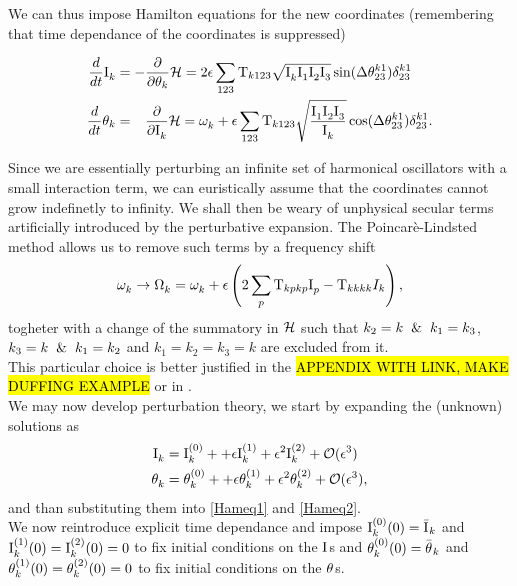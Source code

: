 We can thus impose Hamilton equations for the new coordinates (remembering that time dependance of the coordinates is suppressed)

\begin{align}
    \frac{d}{dt}\mathrm{I}^{}_k &= - \frac{\partial }{\partial \theta_k}\mathcal{H} = 2 \epsilon \sum_{123} \mathrm{T}_{k123} \sqrt{\mathrm{I}^{}_k\mathrm{I}^{}_1\mathrm{I}^{}_2\mathrm{I}^{}_3} \sin(\Delta\theta^{k1}_{23})\delta^{k1}_{23}
    \label{Hameq1}\\
    \frac{d}{dt}\theta_k &= \phantom{-} \frac{\partial }{\partial \mathrm{I}^{}_k}\mathcal{H} = \omega^{}_k + 
    \epsilon \sum_{123} \mathrm{T}_{k123} \sqrt{\frac{\mathrm{I}^{}_1\mathrm{I}^{}_2\mathrm{I}^{}_3}{\mathrm{I}^{}_k}}\cos(\Delta\theta^{k1}_{23})\delta^{k1}_{23}.
    \label{Hameq2}
\end{align}


Since we are essentially perturbing an infinite set of harmonical oscillators with a small interaction term, we can euristically assume that
the coordinates cannot grow indefinetly to infinity. We shall then be weary of unphysical secular terms artificially introduced by the perturbative
expansion. The Poincarè-Lindsted method allows us to remove such terms by a frequency shift
\begin{equation}
    \omega^{}_k \rightarrow \Omega^{}_k = \omega^{}_k + \epsilon \left(2\sum_p \mathrm{T}_{kpkp}\mathrm{I}^{}_p - \mathrm{T}_{kkkk}I_k \right),
\end{equation}   
togheter with a change of the summatory in $\mathcal{H}$ such that $k_2=k \hspace{2mm}\&\hspace{2mm} k_1 = k_3$, $k_3=k \hspace{2mm}\& \hspace{2mm}k_1=k_2$ and $k_1=k_2=k_3=k$ are excluded from it. \\
This particular choice is better justified in the \hl{APPENDIX WITH LINK, MAKE DUFFING EXAMPLE} or in \cite{Nazarenko2011}. \\

We may now develop perturbation theory, we start by expanding the (unknown) solutions as
\begin{align}
    \mathrm{I}^{}_k &= \mathrm{I}^{(0)}_k +  + \epsilon \mathrm{I}^{(1)}_k + \epsilon^2 \mathrm{I}^{(2)}_k + \mathcal{O}(\epsilon^3) \\
    \theta^{}_k &= \theta^{(0)}_k +  + \epsilon \theta^{(1)}_k + \epsilon^2 \theta^{(2)}_k + \mathcal{O}(\epsilon^3),
\end{align}
and than substituting them into \eqref{Hameq1} and \eqref{Hameq2}. \\
We now reintroduce explicit time dependance and impose $\mathrm{I}^{(0)}_k(0) = \bar{\mathrm{I}^{}}_k$ and $\mathrm{I}^{(1)}_k(0) = \mathrm{I}^{(2)}_k(0) = 0$ to fix initial conditions on the $\mathrm{I}^{}$s and 
$\theta^{(0)}_k(0) = \bar{\theta^{}}_k$ and $\theta^{(1)}_k(0) = \theta^{(2)}_k(0) = 0$ to fix initial conditions on the $\theta^{}$s.\\


